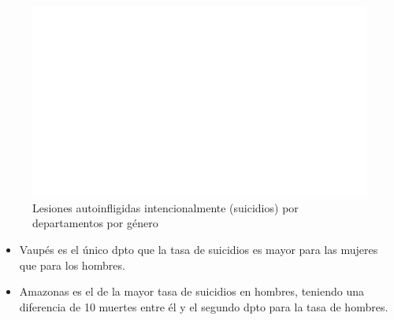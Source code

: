     \begin{figure}[H]
        \caption{Lesiones autoinfligidas intencionalmente (suicidios) por departamentos por género \label{map_result_2} }
        \begin{center}
        \includegraphics[width=\textwidth,keepaspectratio]{img/var_293_scatter_time.png}
        \end{center}
    \end{figure}
            \begin{itemize}
                \item Vaupés es el único dpto que la tasa de suicidios es mayor para las mujeres que para los hombres.
                \item Amazonas es el de la mayor tasa de suicidios en hombres, teniendo una diferencia de 10 muertes entre él y el segundo dpto para la tasa de hombres.
                \end{itemize}

